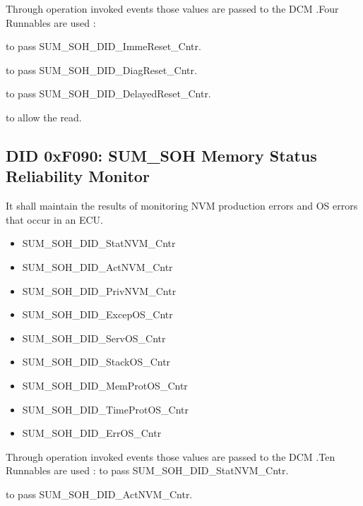 Through operation invoked events those values are passed to the DCM .Four Runnables are used :

{
\textbf{} to pass  SUM\_SOH\_DID\_ImmeReset\_Cntr.
}
{
}

{
\textbf{} to pass SUM\_SOH\_DID\_DiagReset\_Cntr.
}
{
}

{
\textbf{} to pass SUM\_SOH\_DID\_DelayedReset\_Cntr.
} 
{
}

{
\textbf{} to allow the read.
}
{
}
 

\subsection{DID 0xF090: SUM_SOH Memory Status Reliability Monitor}

{
It shall maintain the results of monitoring NVM production errors and OS errors that occur in an ECU.

\begin{itemize}
\item	SUM\_SOH\_DID\_StatNVM\_Cntr
\item	SUM\_SOH\_DID\_ActNVM\_Cntr
\item	SUM\_SOH\_DID\_PrivNVM\_Cntr
\item	SUM\_SOH\_DID\_ExcepOS\_Cntr
\item	SUM\_SOH\_DID\_ServOS\_Cntr
\item	SUM\_SOH\_DID\_StackOS\_Cntr
\item	SUM\_SOH\_DID\_MemProtOS\_Cntr
\item	SUM\_SOH\_DID\_TimeProtOS\_Cntr
\item	SUM\_SOH\_DID\_ErrOS\_Cntr
\end{itemize}
}
{
   
}

Through operation invoked events those values are passed to the DCM .Ten Runnables are used :
{
\textbf{} to pass  SUM\_SOH\_DID\_StatNVM\_Cntr.
}
{
}

{
\textbf{} to pass  SUM\_SOH\_DID\_ActNVM\_Cntr.
}
{
}

